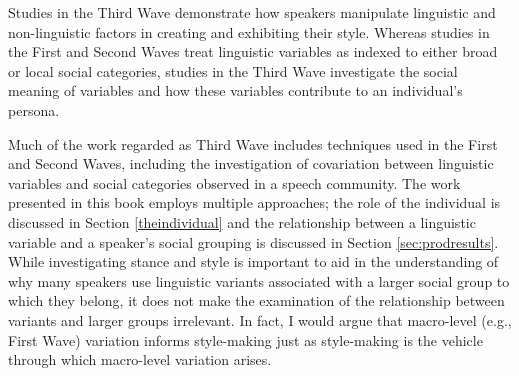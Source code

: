 
Studies in the Third Wave demonstrate how speakers manipulate linguistic and non-linguistic factors in creating and exhibiting their style.  Whereas studies in the First and Second Waves treat linguistic variables as indexed to either broad or local social categories, studies in the Third Wave investigate the social meaning of variables and how these variables contribute to an individual's persona.  

Much of the work regarded as Third Wave includes techniques used in the First and Second Waves, including the investigation of covariation between linguistic variables and social categories observed in a speech community.  The work presented in this book employs multiple approaches; the role of the individual is discussed in Section \ref{theindividual} and the relationship between a linguistic variable and a speaker's social grouping is discussed in Section \ref{sec:prodresults}.  While investigating stance and style is important to aid in the understanding of why many speakers use linguistic variants associated with a larger social group to which they belong, it does not make the examination of the relationship between variants and larger groups irrelevant.  In fact, I would argue that macro-level (e.g., First Wave) variation informs style-making just as style-making is the vehicle through which macro-level variation arises.


  

